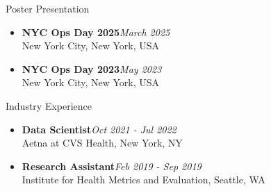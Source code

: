 \documentclass{resume} %
\begin{document}
\begin{rSection}{Poster Presentation}
\begin{itemize}
\item {\bf NYC Ops Day 2025}\hfill {\em March 2025}\\
New York City, New York, USA
\item {\bf NYC Ops Day 2023}\hfill {\em May 2023}\\
New York City, New York, USA
\end{itemize}
\end{rSection}

\begin{rSection}{Industry Experience}
\begin{itemize}
\item {\bf Data Scientist}\hfill {\em Oct 2021 - Jul 2022}\\
Aetna at CVS Health, New York, NY
\item {\bf Research Assistant}\hfill {\em Feb 2019 - Sep 2019}\\
Institute for Health Metrics and Evaluation, Seattle, WA
\end{itemize}
\end{rSection}
\end{document}
